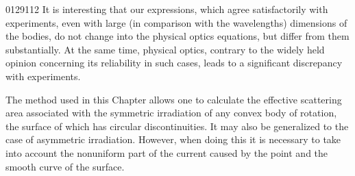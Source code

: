\begin{scanpage}{0129}{112}
It is interesting that our expressions, which agree satisfactorily with experiments, even with large (in comparison with the wavelengths) dimensions of the bodies, do not change into the physical optics equations, but differ from them substantially. At the same time, physical optics, contrary to the widely held opinion concerning its reliability in such cases, leads to a significant discrepancy with experiments.

The method used in this Chapter allows one to calculate the effective scattering area associated with the symmetric irradiation of any convex body of rotation, the surface of which has circular discontinuities. It may also be generalized to the case of asymmetric irradiation. However, when doing this it is necessary to take into account the nonuniform part of the current caused by the point and the smooth curve of the surface.
\end{scanpage}
